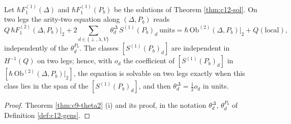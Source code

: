 \begin{theorem}
\label{thm:c12-theta}
Let $\hbar F_1^{(1)}(\Delta)$ and $\hbar F_1^{(1)}(P_b)$ be the solutions of Theorem \ref{thm:c12-sol}. On two legs the arity-two equation along $(\Delta,P_b)$ reads
\begin{equation}
Q\,\hbar F_1^{(2)}(\Delta,P_b)\big|_2+2\sum_{d\in\{\perp,\lambda,V\}}\theta^\Delta_d\,S^{(1)}(P_b)_d\ \text{units}=\hbar\,\mathrm{Ob}^{(2)}(\Delta,P_b)\big|_2+Q(\text{local}),
\label{eq:c12-theta}
\end{equation}
independently of the $\theta^{P_b}_d$. The classes $[S^{(1)}(P_b)_d]$ are independent in $H^{-1}(Q)$ on two legs; hence, with $o_d$ the coefficient of $[S^{(1)}(P_b)_d]$ in $[\hbar\,\mathrm{Ob}^{(2)}(\Delta,P_b)|_2]$, the equation is solvable on two legs exactly when this class lies in the span of the $[S^{(1)}(P_b)_d]$, and then $\theta^\Delta_d=\tfrac12o_d$ in units.
\end{theorem}

\begin{proof}
Theorem \ref{thm:c9-theta2} (i) and its proof, in the notation $\theta^\Delta_d$, $\theta^{P_b}_d$ of Definition \ref{def:c12-gens}.
\end{proof}

